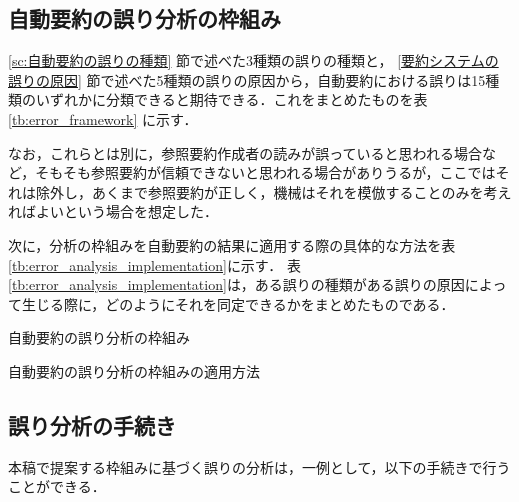 \subsection{自動要約の誤り分析の枠組み}

\ref{sc:自動要約の誤りの種類} 節で述べた3種類の誤りの種類と， \ref{要約システムの誤りの原因} 節で述べた5種類の誤りの原因から，自動要約における誤りは15種類のいずれかに分類できると期待できる．これをまとめたものを表 \ref{tb:error_framework} に示す．

なお，これらとは別に，参照要約作成者の読みが誤っていると思われる場合など，そもそも参照要約が信頼できないと思われる場合がありうるが，ここではそれは除外し，あくまで参照要約が正しく，機械はそれを模倣することのみを考えればよいという場合を想定した．

次に，分析の枠組みを自動要約の結果に適用する際の具体的な方法を表\ref{tb:error_analysis_implementation}に示す．
表\ref{tb:error_analysis_implementation}は，ある誤りの種類がある誤りの原因によって生じる際に，どのようにそれを同定できるかをまとめたものである．

\begin{table}[p]
\caption{自動要約の誤り分析の枠組み}
\label{tb:error_framework}
\addtolength{\normalbaselineskip}{-1pt}

\end{table}

\begin{table}[t]
\caption{自動要約の誤り分析の枠組みの適用方法}
\label{tb:error_analysis_implementation}

\end{table}


\subsection{誤り分析の手続き}
\label{sc:誤り分析の手続き}

本稿で提案する枠組みに基づく誤りの分析は，一例として，以下の手続きで行うことができる．

